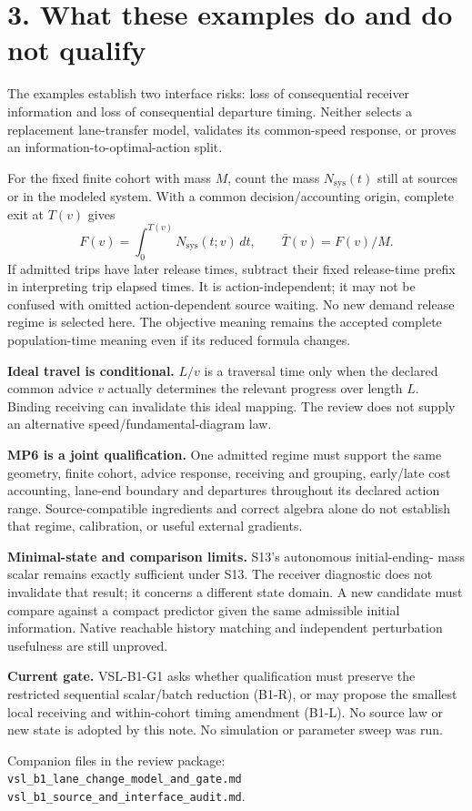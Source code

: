 \documentclass[11pt,a4paper]{article}
\begin{document}
\newpage
\section*{3. What these examples do and do not qualify}
The examples establish two interface risks: loss of consequential receiver
information and loss of consequential departure timing. Neither selects a
replacement lane-transfer model, validates its common-speed response, or proves
an information-to-optimal-action split.

For the fixed finite cohort with mass $M$, count the mass $N_{\mathrm{sys}}(t)$
still at sources or in the modeled system. With a common decision/accounting
origin, complete exit at $T(v)$ gives
\[
 F(v)=\int_0^{T(v)}N_{\mathrm{sys}}(t;v)\,dt,
 \qquad \bar T(v)=F(v)/M.
\]
If admitted trips have later release times, subtract their fixed release-time
prefix in interpreting trip elapsed times. It is action-independent; it may
not be confused with omitted action-dependent source waiting. No new demand
release regime is selected here. The objective meaning remains the accepted
complete population-time meaning even if its reduced formula changes.

\textbf{Ideal travel is conditional.} $L/v$ is a traversal time only when the
declared common advice $v$ actually determines the relevant progress over
length $L$. Binding receiving can invalidate this ideal mapping. The review
does not supply an alternative speed/fundamental-diagram law.

\textbf{MP6 is a joint qualification.} One admitted regime must support the
same geometry, finite cohort, advice response, receiving and grouping,
early/late cost accounting, lane-end boundary and departures throughout its
declared action range. Source-compatible ingredients and correct algebra alone
do not establish that regime, calibration, or useful external gradients.

\textbf{Minimal-state and comparison limits.} S13's autonomous initial-ending-
mass scalar remains exactly sufficient under S13. The receiver diagnostic
does not invalidate that result; it concerns a different state domain. A new
candidate must compare against a compact predictor given the same admissible
initial information. Native reachable history matching and independent
perturbation usefulness are still unproved.

\textbf{Current gate.} VSL-B1-G1 asks whether qualification must preserve the
restricted sequential scalar/batch reduction (B1-R), or may propose the
smallest local receiving and within-cohort timing amendment (B1-L). No source
law or new state is adopted by this note. No simulation or parameter sweep
was run.

\vfill
Companion files in the review package:\\
\texttt{vsl\_b1\_lane\_change\_model\_and\_gate.md}\\
\texttt{vsl\_b1\_source\_and\_interface\_audit.md}.
\end{document}

